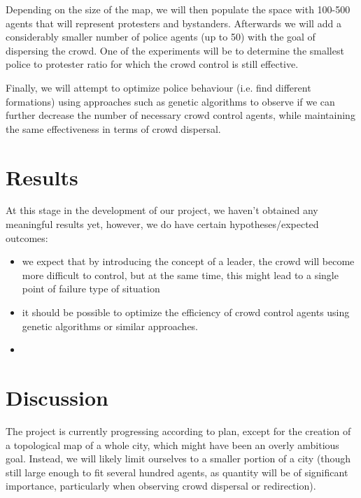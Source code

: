 \documentclass[9pt]{pnas-new}
\begin{document}
\bigskip
Depending on the size of the map, we will then populate the space with 100-500 agents that will represent protesters and bystanders. Afterwards we will add a considerably smaller number of police agents (up to 50) with the goal of dispersing the crowd. One of the experiments will be to determine the smallest police to protester ratio for which the crowd control is still effective. 

\bigskip
Finally, we will attempt to optimize police behaviour (i.e. find different formations) using approaches such as genetic algorithms to observe if we can further decrease the number of necessary crowd control agents, while maintaining the same effectiveness in terms of crowd dispersal. 

\section*{Results}

At this stage in the development of our project, we haven't obtained any meaningful results yet, however, we do have certain hypotheses/expected outcomes:
\begin{itemize}
    \item we expect that by introducing the concept of a leader, the crowd will become more difficult to control, but at the same time, this might lead to a single point of failure type of situation
    \item it should be possible to optimize the efficiency of crowd control agents using genetic algorithms or similar approaches. 
    \item
\end{itemize}

\section*{Discussion}

The project is currently progressing according to plan, except for the creation of a topological map of a whole city, which might have been an overly ambitious goal. Instead, we will likely limit ourselves to a smaller portion of a city (though still large enough to fit several hundred agents, as quantity will be of significant importance, particularly when observing crowd dispersal or redirection). 


\showacknow %


\begin{multicols}{2}
\section*{\bibname}

\end{multicols}
\end{document}
